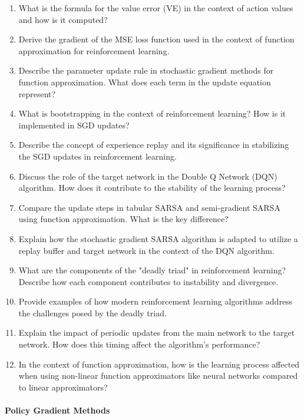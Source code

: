 \begin{enumerate}
	\item What is the formula for the value error (VE) in the context of action values and how is it computed?
    \item Derive the gradient of the MSE loss function used in the context of function approximation for reinforcement learning.
	\item Describe the parameter update rule in stochastic gradient methods for function approximation. What does each term in the update equation represent?
    \item What is bootstrapping in the context of reinforcement learning? How is it implemented in SGD updates?
    \item Describe the concept of experience replay and its significance in stabilizing the SGD updates in reinforcement learning.
    \item Discuss the role of the target network in the Double Q Network (DQN) algorithm. How does it contribute to the stability of the learning process?
    \item Compare the update steps in tabular SARSA and semi-gradient SARSA using function approximation. What is the key difference?
    \item Explain how the stochastic gradient SARSA algorithm is adapted to utilize a replay buffer and target network in the context of the DQN algorithm.
    \item What are the components of the "deadly triad" in reinforcement learning? Describe how each component contributes to instability and divergence.
    \item Provide examples of how modern reinforcement learning algorithms address the challenges posed by the deadly triad.
    \item Explain the impact of periodic updates from the main network to the target network. How does this timing affect the algorithm's performance?
    \item In the context of function approximation, how is the learning process affected when using non-linear function approximators like neural networks compared to linear approximators?
\end{enumerate}

\paragraph*{Policy Gradient Methods}

